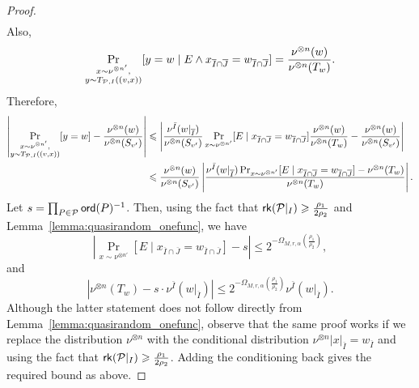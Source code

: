 \documentclass[10pt,a4paper]{amsart}
\newcommand\card[1]{\left| {#1} \right|}
\renewcommand\geq{\geqslant}
\renewcommand\leq{\leqslant}
\begin{document}
\begin{proof}
\begin{align*}
\end{align*}
Also, 
\begin{align*}
    \Pr_{\substack{x\sim \nu^{\otimes n'},\\ y\sim {\rm T}_{\mathcal{P},I} ((v, x))}}[y=w \mid E \wedge x_{\overline{I}\cap \overline{J}} = w_{\overline{I}\cap \overline{J}}] = \frac{\nu^{\otimes n}(w)}{\nu^{\otimes n}(T_w)}.
\end{align*}
Therefore,
\begin{align*}
    \card{\Pr_{\substack{x\sim \nu^{\otimes n'},\\ y\sim {\rm T}_{\mathcal{P},I} ((v, x))}}[y=w]  - \frac{\nu^{\otimes n}(w)}{\nu^{\otimes n}(S_{v'})}} &\leq \card{ \frac{\nu^{\bar{I}}(w|_{\overline{I}})}{\nu^{\otimes n}(S_{v'})}\Pr_{x\sim \nu^{\otimes n'}}[ E \mid x_{\overline{I}\cap \overline{J}} = w_{\overline{I}\cap \overline{J}}] \frac{\nu^{\otimes n}(w)}{\nu^{\otimes n}(T_w)}   -\frac{\nu^{\otimes n}(w)}{\nu^{\otimes n}(S_{v'})}}\\
    &\leq \frac{\nu^{\otimes n}(w)}{\nu^{\otimes n}(S_{v'})}\card{ \frac{\nu^{\bar{I}}(w|_{\overline{I}})\Pr_{x\sim \nu^{\otimes n'}}[ E \mid x_{\overline{I}\cap \overline{J}} = w_{\overline{I}\cap \overline{J}}] - \nu^{\otimes n}(T_w)}{\nu^{\otimes n}(T_w)}}.
\end{align*}
Let $s= \prod_{P\in \mathcal{P}} {\sf ord}(P)^{-1}$. Then, using the fact that  ${\sf rk}(\mathcal{P}|_{{I}})\geq \frac{\rho_1}{2\rho_2}$ and Lemma~\ref{lemma:quasirandom_onefunc}, we have
$$ \card{\Pr_{x\sim \nu^{\otimes n'}}[ E \mid x_{\overline{I}\cap \overline{J}} = w_{\overline{I}\cap \overline{J}}] - s} \leq 2^{-\Omega_{M,r,\alpha}\left(\frac{\rho_1}{\rho_2}\right)},$$
and
$$\card{\nu^{\otimes n}(T_w) - s\cdot \nu^{\bar{I}}(w|_{\overline{I}})} \leq 2^{-\Omega_{M,r,\alpha}\left(\frac{\rho_1}{\rho_2}\right)}\nu^{\bar{I}}(w|_{\overline{I}}).$$
Although the latter statement does not follow directly from Lemma~\ref{lemma:quasirandom_onefunc}, observe that the same proof works if we replace the distribution $\nu^{\otimes n}$ with the conditional distribution $\nu^{\otimes n}|x|_{\overline{I}}= w_{\overline{I}}$ and using the fact that  ${\sf rk}(\mathcal{P}|_{{I}})\geq \frac{\rho_1}{2\rho_2}$. Adding the conditioning back gives the required bound as above.


\end{proof}
\end{document}
